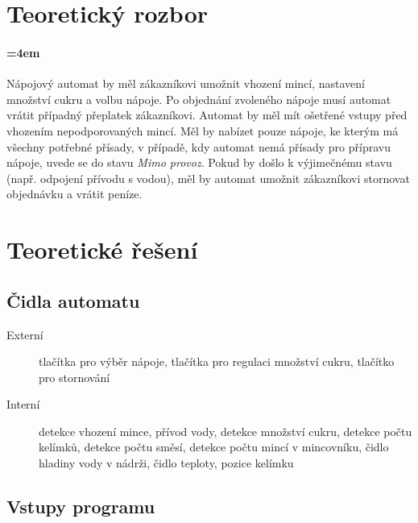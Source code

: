 \documentclass[12pt,a4paper]{article}
\begin{document}
\section{Teoretický rozbor}

\paragraph{\parindent=4em}{	
	Nápojový automat by měl zákazníkovi umožnit vhození mincí, nastavení množství cukru a volbu nápoje. Po objednání zvoleného nápoje musí automat vrátit případný přeplatek zákazníkovi. Automat by měl mít ošetřené vstupy před vhozením nepodporovaných mincí. Měl by nabízet pouze nápoje, ke kterým má všechny potřebné přísady, v případě, kdy automat nemá
	přísady pro přípravu nápoje, uvede se do stavu {\it Mimo provoz}. Pokud by došlo k výjimečnému stavu (např. odpojení přívodu s vodou), měl by automat umožnit zákazníkovi stornovat objednávku a vrátit peníze.
}

\newpage
\section{Teoretické řešení}

\subsection{Čidla automatu}

\begin{description}

\item [Externí] tlačítka pro výběr nápoje, tlačítka pro regulaci množství cukru, tlačítko pro stornování

\item [Interní] detekce vhození mince, přívod vody, detekce množství cukru, detekce počtu kelímků, detekce počtu směsí, detekce počtu mincí v mincovníku, čidlo hladiny vody v nádrži, čidlo teploty, pozice kelímku

\end{description}

\subsection{Vstupy programu}
\end{document}
